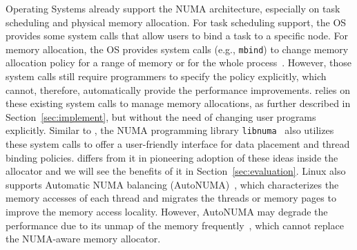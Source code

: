





Operating Systems already support the NUMA architecture, especially on task scheduling and physical memory allocation. For task scheduling support, the OS provides some system calls that allow users to bind a task to a specific node. For memory allocation, the OS provides system calls (e.g., \texttt{mbind}) to change memory allocation policy for a range of memory or for the whole process~\cite{lameter2013numa, diener2015locality}. However, those system calls still require programmers to specify the policy explicitly, which cannot, therefore, automatically provide the performance improvements. \NM{} relies on these existing system calls to manage memory allocations, as further described in Section~\ref{sec:implement}, but without the need of changing user programs explicitly. Similar to \NM{}, the NUMA programming library \texttt{libnuma}~\cite{libnuma} also utilizes these system calls to offer a user-friendly interface for data placement and thread binding policies. \NM{} differs from it in pioneering adoption of these ideas inside the allocator and we will see the benefits of it in Section~\ref{sec:evaluation}. Linux also supports Automatic NUMA balancing (AutoNUMA)~\cite{AutoNUMA2}, which characterizes the memory accesses of each thread and migrates the threads or memory pages to improve the memory access locality. However, AutoNUMA may degrade the performance due to its unmap of the memory frequently~\cite{autonumaissue}, which cannot replace the NUMA-aware memory allocator.

